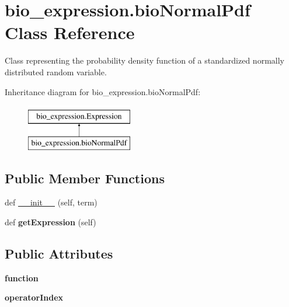 \hypertarget{classbio__expression_1_1bio_normal_pdf}{}\section{bio\+\_\+expression.\+bio\+Normal\+Pdf Class Reference}
\label{classbio__expression_1_1bio_normal_pdf}


Class representing the probability density function of a standardized normally distributed random variable.  


Inheritance diagram for bio\+\_\+expression.\+bio\+Normal\+Pdf\+:\begin{figure}[H]
\begin{center}
\leavevmode
\includegraphics[height=2.000000cm]{classbio__expression_1_1bio_normal_pdf}
\end{center}
\end{figure}
\subsection*{Public Member Functions}
\begin{DoxyCompactItemize}
\item 
def \hyperlink{classbio__expression_1_1bio_normal_pdf_a1b793b98222055da71bce055cb7f99c2}{\+\_\+\+\_\+init\+\_\+\+\_\+} (self, term)
\item 
def {\bfseries get\+Expression} (self)\hypertarget{classbio__expression_1_1bio_normal_pdf_a93319a5c1574d28d8636a4f2404694e7}{}\label{classbio__expression_1_1bio_normal_pdf_a93319a5c1574d28d8636a4f2404694e7}

\end{DoxyCompactItemize}
\subsection*{Public Attributes}
\begin{DoxyCompactItemize}
\item 
{\bfseries function}\hypertarget{classbio__expression_1_1bio_normal_pdf_ad59a9659d06a48d7d4a44037f56882c0}{}\label{classbio__expression_1_1bio_normal_pdf_ad59a9659d06a48d7d4a44037f56882c0}

\item 
{\bfseries operator\+Index}\hypertarget{classbio__expression_1_1bio_normal_pdf_a1129591234db4f63d55b09674e027fa7}{}\label{classbio__expression_1_1bio_normal_pdf_a1129591234db4f63d55b09674e027fa7}

\end{DoxyCompactItemize}


